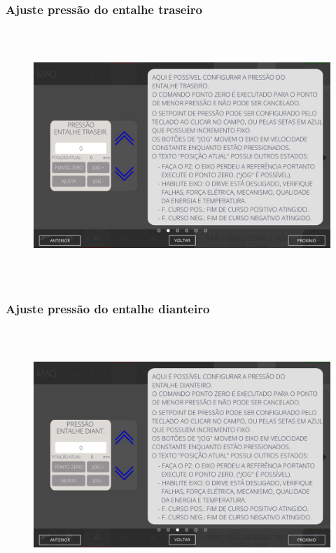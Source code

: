\newpage
\thispagestyle{fancy}
\vspace*{40 pt}
\subsubsection{\small{Ajuste pressão do entalhe traseiro}}
\vspace*{\fill}
\begin{figure}[h]
  \centering
  \includegraphics[width=576px,height=360px]{src/imagesFlexo/05-slotter/settings/e-2.png}
\end{figure}
\vspace*{\fill}

\newpage
\thispagestyle{fancy}
\vspace*{40 pt}
\subsubsection{\small{Ajuste pressão do entalhe dianteiro}}
\vspace*{\fill}
\begin{figure}[h]
  \centering
  \includegraphics[width=576px,height=360px]{src/imagesFlexo/05-slotter/settings/e-3.png}
\end{figure}
\vspace*{\fill}

